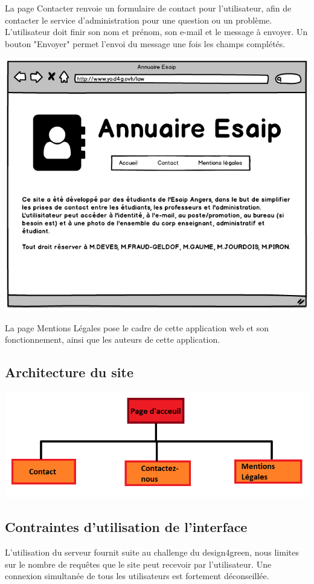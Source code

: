 \documentclass[11pt,a4paper]{report}
\begin{document}
			La page Contacter renvoie un formulaire de contact pour l'utilisateur, afin de contacter le service d'administration pour une question ou un problème. L'utilisateur doit finir son nom et prénom, son e-mail et le message à envoyer. Un bouton "Envoyer" permet l'envoi du message une fois les champs complétés.
			\begin{center}
					\includegraphics[scale=0.4]{site4}
			\end{center}
			La page Mentions Légales pose le cadre de cette application web et son fonctionnement, ainsi que les auteurs de cette application.
			\subsection{Architecture du site}
			\begin{center}
				\includegraphics[scale=0.55]{structure}
			\end{center}
			\subsection{Contraintes d'utilisation de l'interface}
				 L'utilisation du serveur fournit suite au challenge du design4green, nous limites sur le nombre de requêtes que le site peut recevoir par l'utilisateur. Une connexion simultanée de tous les utilisateurs est fortement déconseillée.
		
\end{document}
